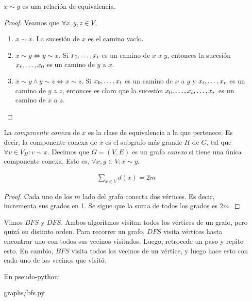 \begin{proposition}
  $x \sim y$ es una relación de equivalencia.
\end{proposition}
\begin{proof}
  Veamos que $\forall x,y,z \in V,$
  \begin{enumerate}
  \item $x \sim x$. La sucesión de $x$ es el camino vacío.
    
  \item $x \sim y \iff y \sim x$. Si $x_0, \mathellipsis, x_t$ es un camino
    de $x$ a $y$, entonces la sucesión $x_t, \mathellipsis, x_0$ es un camino
    de $y$ a $x$.
    
  \item $x \sim y \wedge y \sim z \iff x \sim z$. Si $x_0, \mathellipsis, x_t$
    es un camino de $x$ a $y$ y $x_{t}, \mathellipsis, x_{r}$ es un camino de
    $y$ a $z$, entonces es claro que la sucesión
    $x_0, \mathellipsis, x_t, \mathellipsis, x_r$ es un camino de $x$ a $z$.
  \end{enumerate}
\end{proof}

\begin{definition}
  La \emph{componente conexa} de $x$ es la clase de equivalencia a la que
  pertenece. Es decir, la componente conexa de $x$ es el subgrafo más grande
  $H$ de $G$, tal que $\forall v \in V_H \colon v \sim x$. Decimos que
  $G=(V,E)$ es un grafo \emph{conexo} si tiene una única componente conexa.
  Esto es, $\forall x,y \in V \colon x \sim y$.
\end{definition}

\begin{proposition}
  \begin{align}
    \sum_{x\in V} d(x) = 2m \label{handshaking_lemma}
  \end{align}
\end{proposition}

\begin{proof}
  Cada uno de los $m$ lado del grafo conecta dos vértices. Es decir, incrementa
  sus grados en 1. Se sigue que la suma de todos los grados es $2m$.
\end{proof}


\begin{definition}
  Vimos $BFS$ y $DFS$. Ambos algoritmos visitan todos los vértices de un
  grafo, pero quizá en distinto orden. Para recorrer un grafo, $DFS$ visita
  vértices hasta encontrar uno con todos sus vecinos visitados. Luego,
  retrocede un paso y repite esto. En cambio, $BFS$ visita todos los vecinos
  de un vértice, y luego hace esto con cada uno de los vecinos que visitó.
  
  En pseudo-python:

\begin{lstinputlisting}[language=python]{graphs/bfs.py}
\end{lstinputlisting}
\end{definition}

